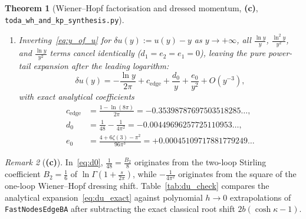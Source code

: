 \documentclass[11pt,a4paper]{article}
\newcommand{\Lc}{\textsf{\textbf{(c)}}}
\newcommand{\scrshort}{\texttt{toda\_\allowbreak wh\_\allowbreak and\_\allowbreak kp\_\allowbreak synthesis.py}}
\newtheorem{theorem}{Theorem}[section]
\theoremstyle{remark}
\newtheorem{remark}[theorem]{Remark}
\begin{document}
\begin{theorem}[Wiener--Hopf factorisation and dressed momentum, \Lc, \scrshort]
\begin{enumerate}
\begin{equation}
    + O(u^{-3}).
  \end{equation}
\item Inverting~\eqref{eq:y_of_u} for $\delta u(y) := u(y) - y$ as $y\to+\infty$, all
  $\frac{\ln y}{y}$, $\frac{\ln^2 y}{y^2}$, and $\frac{\ln y}{y^2}$ terms cancel identically
  ($d_1 = e_2 = e_1 = 0$), leaving the pure power-tail expansion after the leading logarithm:
  \begin{equation}\label{eq:du_exact}
    \boxed{\delta u(y) = -\frac{\ln y}{2\pi} + c_{\mathrm{edge}} + \frac{d_0}{y} + \frac{e_0}{y^2} + O(y^{-3}),}
  \end{equation}
  with exact analytical coefficients
  \begin{align}
    c_{\mathrm{edge}} &= \frac{1 - \ln(8\pi)}{2\pi} = -0.35398787697503518285\dots, \label{eq:cedge}\\
    d_0 &= \frac{1}{48} - \frac{1}{4\pi^2} = -0.00449696257725110953\dots, \label{eq:d0}\\
    e_0 &= \frac{4 + 6\zeta(3) - \pi^2}{96\pi^3} = +0.00045109717881779249\dots \label{eq:e0}
  \end{align}
\end{enumerate}
\end{theorem}

\begin{remark}[\Lc]
In~\eqref{eq:d0}, $\frac{1}{48} = \frac{B_2}{8}$ originates from the two-loop Stirling coefficient
$B_2 = \frac{1}{6}$ of $\ln\Gamma(1 + \frac{s}{2\pi})$, while $-\frac{1}{4\pi^2}$ originates from
the square of the one-loop Wiener--Hopf dressing shift. Table~\ref{tab:du_check} compares the
analytical expansion~\eqref{eq:du_exact} against polynomial $h\to 0$ extrapolations of
\texttt{FastNodesEdgeBA} after subtracting the exact classical root shift $2b(\cosh\kappa - 1)$.
\end{remark}
\end{document}
